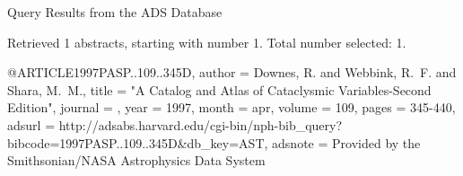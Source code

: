 Query Results from the ADS Database


Retrieved 1 abstracts, starting with number 1.  Total number selected: 1.

@ARTICLE{1997PASP..109..345D,
   author = {{Downes}, R. and {Webbink}, R.~F. and {Shara}, M.~M.},
    title = "{A Catalog and Atlas of Cataclysmic Variables-Second Edition}",
  journal = {\pasp},
     year = 1997,
    month = apr,
   volume = 109,
    pages = {345-440},
   adsurl = {http://adsabs.harvard.edu/cgi-bin/nph-bib_query?bibcode=1997PASP..109..345D&db_key=AST},
  adsnote = {Provided by the Smithsonian/NASA Astrophysics Data System}
}


